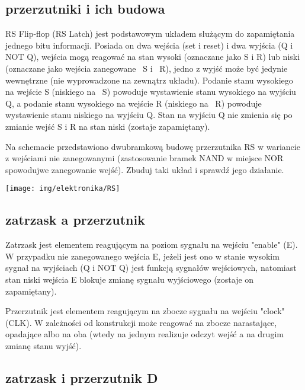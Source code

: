 \documentclass{pdfBooklets}
\begin{document}
\subsection{przerzutniki i ich budowa}

RS Flip-flop (RS Latch) jest podstawowym układem służącym do zapamiętania jednego bitu informacji. Posiada on dwa wejścia (set i reset) i dwa wyjścia (Q i NOT Q), wejścia mogą reagować na stan wysoki (oznaczane jako S i R) lub niski (oznaczane jako wejścia zanegowane ~S i ~R), jedno z wyjść może być jedynie wewnętrzne (nie wyprowadzone na zewnątrz układu). Podanie stanu wysokiego na wejście S (niskiego na ~S) powoduje wystawienie stanu wysokiego na wyjściu Q, a podanie stanu wysokiego na wejście R (niskiego na ~R) powoduje wystawienie stanu niskiego na wyjściu Q. Stan na wyjściu Q nie zmienia się po zmianie wejść S i R na stan niski (zostaje zapamiętany).

\begin{Zadanie}{}{}
\noindent\begin{minipage}[b]{0.6\textwidth}
Na schemacie przedstawiono dwubramkową budowę przerzutnika RS w wariancie z wejściami nie zanegowanymi (zastosowanie bramek NAND w miejsce NOR spowodujwe zanegowanie wejść). Zbuduj taki układ i sprawdź jego działanie.
\end{minipage}
\hfill
\begin{minipage}[b]{0.35\textwidth}
\texttt{[image: img/elektronika/RS]}
\end{minipage}
\end{Zadanie}

\subsection{zatrzask a przerzutnik}

Zatrzask jest elementem reagującym na poziom sygnału na wejściu "enable" (E). W przypadku nie zanegowanego wejścia E, jeżeli jest ono w stanie wysokim sygnał na wyjściach (Q i NOT Q) jest funkcją sygnałów wejściowych, natomiast stan niski wejścia E blokuje zmianę sygnału wyjściowego (zostaje on zapamiętany).

Przerzutnik jest elementem reagującym na zbocze sygnału na wejściu "clock" (CLK). W zależności od konstrukcji może reagować na zbocze narastające, opadające albo na oba (wtedy na jednym realizuje odczyt wejść a na drugim zmianę stanu wyjść).

\subsection{zatrzask i przerzutnik D}
\end{document}
